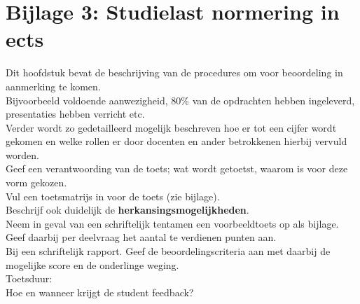 \section*{Bijlage 3: Studielast normering in ects}

		Dit hoofdstuk bevat de beschrijving van de procedures om voor beoordeling in aanmerking te komen.\\
		Bijvoorbeeld voldoende aanwezigheid, 80\% van de opdrachten hebben ingeleverd, presentaties hebben verricht etc.\\

		Verder wordt zo gedetailleerd mogelijk beschreven hoe er tot een cijfer wordt gekomen en welke rollen er door docenten en ander betrokkenen hierbij vervuld worden. \\

		Geef een verantwoording van de toets; wat wordt getoetst, waarom is voor deze vorm gekozen.\\

		Vul een toetsmatrijs in voor de toets (zie bijlage).\\

		Beschrijf ook duidelijk de \textbf{herkansingsmogelijkheden}. \\

		Neem in geval van een schriftelijk tentamen een voorbeeldtoets op als bijlage.\\
		Geef daarbij per deelvraag het aantal te verdienen punten aan. \\

		Bij een schriftelijk rapport. Geef de beoordelingscriteria aan met daarbij de mogelijke score en de onderlinge weging. \\

		Toetsduur: \\

		Hoe en wanneer krijgt de student feedback?\\
